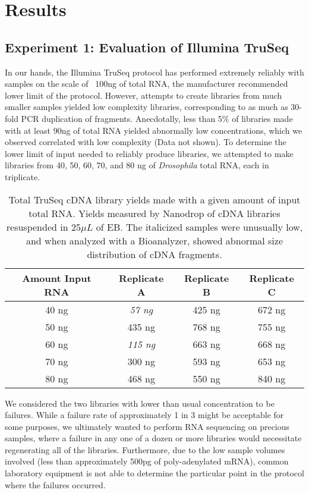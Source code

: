 \section{Results}


\subsection{Experiment 1: Evaluation of Illumina TruSeq}

In our hands, the Illumina TruSeq protocol has performed extremely reliably with samples on the scale of ~100ng of total RNA, the manufacturer recommended lower limit of the protocol.  However, attempts to create libraries from much smaller samples yielded low complexity libraries, corresponding to as much as 30-fold PCR duplication of fragments. Anecdotally, less than 5\% of libraries made with at least 90ng of total RNA yielded abnormally low concentrations, which we observed correlated with low complexity (Data not shown). To determine the lower limit of input needed to reliably produce libraries, we attempted to make libraries from 40, 50, 60, 70, and 80 ng of {\em Drosophila} total RNA, each in triplicate.

\begin{table}[htdp]
\caption{Total TruSeq cDNA library yields made with a given amount of input total RNA.  Yields measured by Nanodrop of cDNA libraries resuspended in 25$\mu L$ of EB. The italicized samples were unusually low, and when analyzed with a Bioanalyzer, showed abnormal size distribution of cDNA fragments.}
\begin{center}
\begin{tabular}{|c|c|c|c|}\hline
Amount Input RNA & Replicate A & Replicate B & Replicate C\\\hline
40 ng & {\em  57 ng}  & 425 ng & 672 ng\\
50 ng & 435 ng & 768 ng & 755 ng\\
60 ng & {\em 115 ng} & 663 ng & 668 ng\\
70 ng & 300 ng & 593 ng & 653 ng\\
80 ng & 468 ng & 550 ng & 840 ng\\\hline
\end{tabular}
\end{center}
\label{table:truseqtitration}
\end{table}

We considered the two libraries with lower than usual concentration to be failures.  While a failure rate of approximately 1 in 3 might be acceptable for some purposes, we ultimately wanted to perform RNA sequencing on precious samples, where a failure in any one of a dozen or more libraries would necessitate regenerating all of the libraries.  Furthermore, due to the low sample volumes involved (less than approximately 500pg of poly-adenylated mRNA), common laboratory equipment is not able to determine the particular point in the protocol where the failures occurred.  

